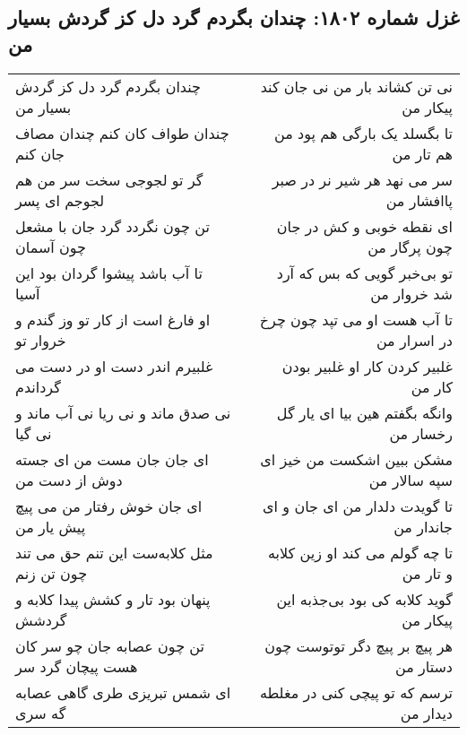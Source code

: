 \begin{center}
\section*{غزل شماره ۱۸۰۲: چندان بگردم گرد دل کز گردش بسیار من}
\label{sec:1802}
\begin{longtable}{l p{0.5cm} r}
چندان بگردم گرد دل کز گردش بسیار من
&&
نی تن کشاند بار من نی جان کند پیکار من
\\
چندان طواف کان کنم چندان مصاف جان کنم
&&
تا بگسلد یک بارگی هم پود من هم تار من
\\
گر تو لجوجی سخت سر من هم لجوجم ای پسر
&&
سر می نهد هر شیر نر در صبر پاافشار من
\\
تن چون نگردد گرد جان با مشعل چون آسمان
&&
ای نقطه خوبی و کش در جان چون پرگار من
\\
تا آب باشد پیشوا گردان بود این آسیا
&&
تو بی‌خبر گویی که بس که آرد شد خروار من
\\
او فارغ است از کار تو وز گندم و خروار تو
&&
تا آب هست او می تپد چون چرخ در اسرار من
\\
غلبیرم اندر دست او در دست می گرداندم
&&
غلبیر کردن کار او غلبیر بودن کار من
\\
نی صدق ماند و نی ریا نی آب ماند و نی گیا
&&
وانگه بگفتم هین بیا ای یار گل رخسار من
\\
ای جان جان مست من ای جسته دوش از دست من
&&
مشکن ببین اشکست من خیز ای سپه سالار من
\\
ای جان خوش رفتار من می پیچ پیش یار من
&&
تا گویدت دلدار من ای جان و ای جاندار من
\\
مثل کلابه‌ست این تنم حق می تند چون تن زنم
&&
تا چه گولم می کند او زین کلابه و تار من
\\
پنهان بود تار و کشش پیدا کلابه و گردشش
&&
گوید کلابه کی بود بی‌جذبه این پیکار من
\\
تن چون عصابه جان چو سر کان هست پیچان گرد سر
&&
هر پیچ بر پیچ دگر توتوست چون دستار من
\\
ای شمس تبریزی طری گاهی عصابه گه سری
&&
ترسم که تو پیچی کنی در مغلطه دیدار من
\\
\end{longtable}
\end{center}

